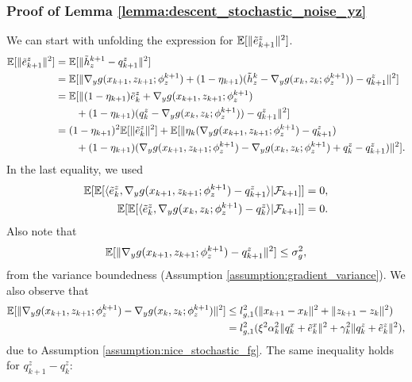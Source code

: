 \subsubsection{Proof of Lemma \ref{lemma:descent_stochastic_noise_yz}}
\label{appendix:proof_stochastic_noise_yz}
We can start with unfolding the expression for $\mathbb{E}[\|\tilde{e}_{k+1}^z\|^2]$. 
\begin{align*}
    \mathbb{E}[\| \tilde{e}_{k+1}^z\|^2] &= \mathbb{E}[\| \tilde{h}_{z}^{k+1} - q_{k+1}^z\|^2] \\
    &= \mathbb{E}[\| \nabla_y g(x_{k+1}, z_{k+1}; \phi_{z}^{k+1}) + (1 - \eta_{k+1}) (\tilde{h}_{z}^{k} - \nabla_y g(x_k, z_k; \phi_z^{k+1})) - q_{k+1}^z\|^2] \\
    &= \mathbb{E}[\| (1 - \eta_{k+1}) \tilde{e}_k^z + \nabla_y g(x_{k+1}, z_{k+1}; \phi_{z}^{k+1}) \\
    &\qquad + (1 - \eta_{k+1}) (q_k^z - \nabla_y g(x_k, z_k; \phi_z^{k+1})) - q_{k+1}^z\|^2] \\
    &= (1 - \eta_{k+1})^2 \mathbb{E}[\| \tilde{e}_k^z\|^2 ] + \mathbb{E}[\|\eta_k (\nabla_y g(x_{k+1}, z_{k+1}; \phi_{z}^{k+1}) - q_{k+1}^z) \\
    &\qquad + (1-\eta_{k+1}) (\nabla_y g(x_{k+1}, z_{k+1}; \phi_{z}^{k+1}) - \nabla_y g(x_k, z_k; \phi_{z}^{k+1}) + q_{k}^z - q_{k+1}^z) \|^2].
\end{align*}
In the last equality, we used
\begin{align*}
    \mathbb{E}[ \mathbb{E}[ \langle \tilde{e}_k^{z}, \nabla_y g(x_{k+1}, z_{k+1}; \phi_{z}^{k+1}) - q_{k+1}^z \rangle | \mathcal{F}_{k+1}] ] &= 0, \\
    \mathbb{E}[ \mathbb{E}[ \langle \tilde{e}_k^{z}, \nabla_y g(x_{k}, z_{k}; \phi_{z}^{k+1}) - q_k^z \rangle | \mathcal{F}_{k+1}] ] &= 0.
\end{align*}
Also note that 
\begin{align*}
    \mathbb{E}[\|\nabla_y g(x_{k+1}, z_{k+1}; \phi_{z}^{k+1}) - q_{k+1}^z\|^2] \le \sigma_g^2,
\end{align*}
from the variance boundedness (Assumption \ref{assumption:gradient_variance}). We also observe that
\begin{align*}
    \mathbb{E}[\|\nabla_y g(x_{k+1}, z_{k+1};\phi_{z}^{k+1}) - \nabla_y g(x_k, z_k; \phi_{z}^{k+1}) \|^2] &\le l_{g,1}^2 (\|x_{k+1} - x_k\|^2 + \|z_{k+1} - z_k\|^2) \\
    &= l_{g,1}^2 (\xi^2 \alpha_k^2 \|q_k^x + \tilde{e}_k^x\|^2 + \gamma_k^2 \|q_k^z + \tilde{e}_k^z\|^2), 
\end{align*}
due to Assumption \ref{assumption:nice_stochastic_fg}. The same inequality holds for $q_{k+1}^z - q_k^z$:
